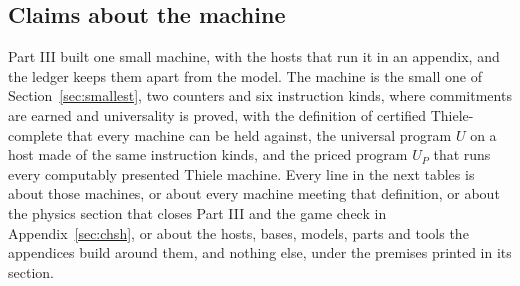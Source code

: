 \documentclass[11pt,twoside]{article}
\theoremstyle{thielethm}
\theoremstyle{thieledef}
\theoremstyle{thieledef}
\theoremstyle{thieledef}
\theoremstyle{thielethm}
\theoremstyle{thieleobs}
\theoremstyle{thielethm}
\begin{document}
\subsection{Claims about the machine}

Part III built one small machine, with the hosts that run it in an appendix, and the ledger keeps
them apart from the model. The machine is the small one of Section~\ref{sec:smallest}, two counters and six instruction kinds, where commitments are earned
and universality is proved, with the definition of certified Thiele-complete that every machine can be
held against, the universal program $U$ on a host made of the same instruction kinds, and the
priced program $U_P$ that runs every computably presented Thiele machine. Every line in the
next tables is about those machines, or about every machine meeting that definition, or about
the physics section that closes Part III and the game check in Appendix~\ref{sec:chsh}, or about the hosts, bases, models, parts and
tools the appendices build around them, and nothing else, under the premises printed in its section.
\end{document}
